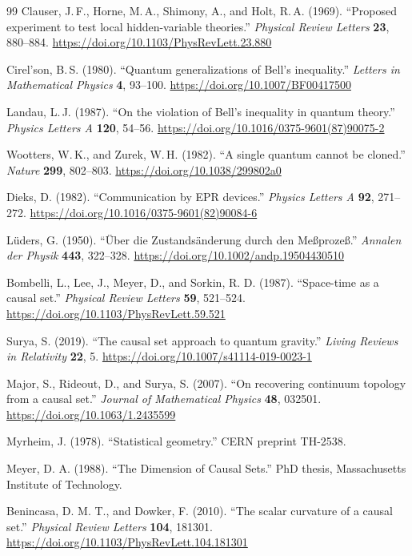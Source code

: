 \documentclass[11pt]{article}
\theoremstyle{definition}
\theoremstyle{remark}
\begin{document}
{\begin{thebibliography}{99}
Clauser, J.\,F., Horne, M.\,A., Shimony, A., and Holt, R.\,A. (1969).
``Proposed experiment to test local hidden-variable theories.''
\emph{Physical Review Letters} \textbf{23}, 880--884.
\url{https://doi.org/10.1103/PhysRevLett.23.880}

Cirel'son, B.\,S. (1980). ``Quantum generalizations of Bell's inequality.''
\emph{Letters in Mathematical Physics} \textbf{4}, 93--100.
\url{https://doi.org/10.1007/BF00417500}

Landau, L.\,J. (1987). ``On the violation of Bell's inequality in quantum
theory.'' \emph{Physics Letters A} \textbf{120}, 54--56.
\url{https://doi.org/10.1016/0375-9601(87)90075-2}

Wootters, W.\,K., and Zurek, W.\,H. (1982). ``A single quantum cannot be
cloned.'' \emph{Nature} \textbf{299}, 802--803.
\url{https://doi.org/10.1038/299802a0}

Dieks, D. (1982). ``Communication by EPR devices.'' \emph{Physics Letters A}
\textbf{92}, 271--272. \url{https://doi.org/10.1016/0375-9601(82)90084-6}

L\"uders, G. (1950). ``\"Uber die Zustands\"anderung durch den
Me{\ss}proze{\ss}.'' \emph{Annalen der Physik} \textbf{443}, 322--328.
\url{https://doi.org/10.1002/andp.19504430510}

Bombelli, L., Lee, J., Meyer, D., and Sorkin, R. D. (1987). ``Space-time
as a causal set.'' \emph{Physical Review Letters} \textbf{59}, 521--524.
\url{https://doi.org/10.1103/PhysRevLett.59.521}

Surya, S. (2019). ``The causal set approach to quantum gravity.''
\emph{Living Reviews in Relativity} \textbf{22}, 5.
\url{https://doi.org/10.1007/s41114-019-0023-1}

Major, S., Rideout, D., and Surya, S. (2007). ``On recovering continuum
topology from a causal set.'' \emph{Journal of Mathematical Physics}
\textbf{48}, 032501.
\url{https://doi.org/10.1063/1.2435599}

Myrheim, J. (1978). ``Statistical geometry.'' CERN preprint TH-2538.

Meyer, D. A. (1988). ``The Dimension of Causal Sets.'' PhD thesis,
Massachusetts Institute of Technology.

Benincasa, D. M. T., and Dowker, F. (2010). ``The scalar curvature of a
causal set.'' \emph{Physical Review Letters} \textbf{104}, 181301.
\url{https://doi.org/10.1103/PhysRevLett.104.181301}


\end{thebibliography}}
\end{document}
